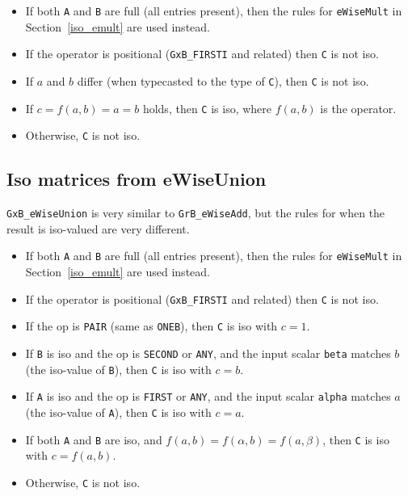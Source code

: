 \documentclass[12pt]{article}
\begin{document}
    \begin{itemize}
    \item If both \verb'A' and \verb'B' are full (all entries present), then
    the rules for \verb'eWiseMult' in Section~\ref{iso_emult} are used
    instead.

    \item If the operator is positional (\verb'GxB_FIRSTI' and related) then
    \verb'C' is not iso.

    \item If $a$ and $b$ differ (when typecasted to the type of \verb'C'),
    then \verb'C' is not iso.

    \item If $c=f(a,b) = a = b$ holds, then \verb'C' is iso,
    where $f(a,b)$ is the operator.

    \item Otherwise, \verb'C' is not iso.
    \end{itemize}

\subsection{Iso matrices from eWiseUnion}
\label{iso_union}

\verb'GxB_eWiseUnion' is very similar to \verb'GrB_eWiseAdd', but the rules
for when the result is iso-valued are very different.

    \begin{itemize}
    \item If both \verb'A' and \verb'B' are full (all entries present), then
    the rules for \verb'eWiseMult' in Section~\ref{iso_emult} are used
    instead.

    \item If the operator is positional (\verb'GxB_FIRSTI' and related) then
    \verb'C' is not iso.

    \item If the op is \verb'PAIR' (same as \verb'ONEB'),
        then \verb'C' is iso with $c=1$.

    \item If \verb'B' is iso and the op is \verb'SECOND' or \verb'ANY',
        and the input scalar \verb'beta' matches $b$
        (the iso-value of \verb'B'),
        then \verb'C' is iso with $c=b$.

    \item If \verb'A' is iso and the op is \verb'FIRST' or \verb'ANY',
        and the input scalar \verb'alpha' matches $a$
        (the iso-value of \verb'A'),
        then \verb'C' is iso with $c=a$.

    \item If both \verb'A' and \verb'B' are iso,
        and $f(a,b) = f(\alpha,b) = f(a,\beta)$,
        then \verb'C' is iso with $c=f(a,b)$.

    \item Otherwise, \verb'C' is not iso.
    \end{itemize}
\end{document}
